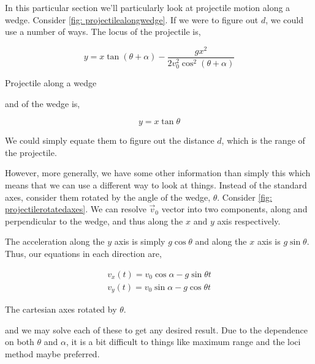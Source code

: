 In this particular section we'll particularly look at projectile motion along a wedge. Consider 
\cref{fig: projectilealongwedge}. If we were to figure out \(d\), we could 
use a number of ways. The locus of the projectile is,

\begin{equation*}
    y = x\tan(\theta+\alpha) - \frac{gx^2}{2v_0^2\cos^2(\theta+\alpha)}
\end{equation*}

\begin{marginfigure}
    \centering
    \caption{Projectile along a wedge}
    \label{fig: projectilealongwedge}
\end{marginfigure}

and of the wedge is,

\begin{equation*}
    y = x\tan\theta 
\end{equation*}

We could simply equate them to figure out the distance \(d\), which is the range of the projectile.

However, more generally, we have some other information than simply this which means that we 
can use a different way to look at things. Instead of the standard axes, consider them rotated 
by the angle of the wedge, \(\theta\). Consider \cref{fig: projectilerotatedaxes}.
We can resolve \(\vec{v}_0\) vector into two components, along and perpendicular to the wedge,
and thus along the \(x\) and \(y\) axis respectively. 


The acceleration along the \(y\) axis is simply \(g\cos\theta\) and along the \(x\) axis 
is \(g\sin\theta\). Thus, our equations in each direction are,

\begin{align*}
    v_x(t) = v_0\cos\alpha - g\sin\theta t\\
    v_y(t) = v_0\sin\alpha - g\cos\theta t 
\end{align*}

\begin{marginfigure}
    \centering
    \caption{The cartesian axes rotated by \(\theta\).}
    \label{fig: projectilerotatedaxes}
\end{marginfigure}

and we may solve each of these to get any desired result. Due to the dependence 
on both \(\theta\) and \(\alpha\), it is a bit difficult to things like maximum range
and the loci method maybe preferred.  

